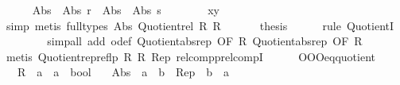 \begin{isabellebody}
\ \ \ \ \isamarkupfalse%
\ {\isachardoublequoteopen}{\isacharparenleft}{\kern0pt}Abs{}\ {\isasymcirc}\ Abs{}{\isacharparenright}{\kern0pt}\ r\ {\isacharequal}{\kern0pt}\ {\isacharparenleft}{\kern0pt}Abs{}\ {\isasymcirc}\ Abs{}{\isacharparenright}{\kern0pt}\ s{\isachardoublequoteclose}\isanewline
\ \ \ \ \ \ \isamarkupfalse%
\ xy\ \isamarkupfalse%
\ simp\ {\isacharparenleft}{\kern0pt}metis\ {\isacharparenleft}{\kern0pt}full{\isacharunderscore}{\kern0pt}types{\isacharparenright}{\kern0pt}\ Abs{}\ Quotient{}{\isacharunderscore}{\kern0pt}rel\ R{}\ R{}{\isacharparenright}{\kern0pt}\isanewline
\ \ \isamarkupfalse%
\isanewline
\ \ \isamarkupfalse%
\ {\isacharquery}{\kern0pt}thesis\isanewline
\ \ \ \ \isamarkupfalse%
\ {\isacharparenleft}{\kern0pt}rule\ Quotient{}I{\isacharparenright}{\kern0pt}\isanewline
\ \ \ \ \isamarkupfalse%
\ {\isacharasterisk}{\kern0pt}\ \isamarkupfalse%
\ {\isacharparenleft}{\kern0pt}simp{\isacharunderscore}{\kern0pt}all\ add{\isacharcolon}{\kern0pt}\ o{\isacharunderscore}{\kern0pt}def\ Quotient{}{\isacharunderscore}{\kern0pt}abs{\isacharunderscore}{\kern0pt}rep\ {\isacharbrackleft}{\kern0pt}OF\ R{}{\isacharbrackright}{\kern0pt}\ Quotient{}{\isacharunderscore}{\kern0pt}abs{\isacharunderscore}{\kern0pt}rep\ {\isacharbrackleft}{\kern0pt}OF\ R{}{\isacharbrackright}{\kern0pt}{\isacharparenright}{\kern0pt}\isanewline
\ \ \ \ \isamarkupfalse%
\ {\isacharparenleft}{\kern0pt}metis\ Quotient{}{\isacharunderscore}{\kern0pt}rep{\isacharunderscore}{\kern0pt}reflp\ R{}\ R{}\ Rep{}\ relcompp{\isachardot}{\kern0pt}relcompI{\isacharparenright}{\kern0pt}\isanewline
\ \ \ \ \isamarkupfalse%
\isanewline
{}\isamarkupfalse%
%
\endisatagproof
{\isafoldproof}%
%
\isadelimproof
\isanewline
%
\endisadelimproof
\isanewline
{}\isamarkupfalse%
\ OOO{\isacharunderscore}{\kern0pt}eq{\isacharunderscore}{\kern0pt}quotient{}{\isacharcolon}{\kern0pt}\isanewline
\ \ \ R{}\ {\isacharcolon}{\kern0pt}{\isacharcolon}{\kern0pt}\ {\isachardoublequoteopen}{\isacharprime}{\kern0pt}a\ {\isasymRightarrow}\ {\isacharprime}{\kern0pt}a\ {\isasymRightarrow}\ bool{\isachardoublequoteclose}\isanewline
\ \ \ Abs{}\ {\isacharcolon}{\kern0pt}{\isacharcolon}{\kern0pt}\ {\isachardoublequoteopen}{\isacharprime}{\kern0pt}a\ {\isasymRightarrow}\ {\isacharprime}{\kern0pt}b{\isachardoublequoteclose}\ \ Rep{}\ {\isacharcolon}{\kern0pt}{\isacharcolon}{\kern0pt}\ {\isachardoublequoteopen}{\isacharprime}{\kern0pt}b\ {\isasymRightarrow}\ {\isacharprime}{\kern0pt}a{\isachardoublequoteclose}\isanewline

\end{isabellebody}
